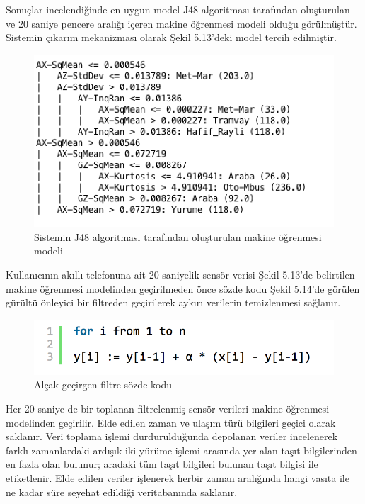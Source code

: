 Sonuçlar incelendiğinde en uygun model J48 algoritması tarafından oluşturulan ve 20 saniye pencere aralığı içeren makine öğrenmesi modeli olduğu görülmüştür. Sistemin çıkarım mekanizması olarak Şekil 5.13'deki model tercih edilmiştir.
\begin{figure}[!h]
\centering
\includegraphics[scale = 0.8]{projectChapters/images/j48model.png}
\caption{Sistemin J48 algoritması tarafından oluşturulan makine öğrenmesi modeli}
\end{figure}

Kullanıcının akıllı telefonuna ait 20 saniyelik sensör verisi Şekil 5.13'de belirtilen makine öğrenmesi modelinden geçirilmeden önce sözde kodu Şekil 5.14'de görülen gürültü önleyici bir filtreden geçirilerek aykırı verilerin temizlenmesi sağlanır. 
\begin{figure}[!h]
\centering
\includegraphics[scale = 0.8]{projectChapters/images/lowPassFilter.png}
\caption{Alçak geçirgen filtre sözde kodu}
\end{figure}

Her 20 saniye de bir toplanan filtrelenmiş sensör verileri makine öğrenmesi modelinden geçirilir. Elde edilen zaman ve ulaşım türü bilgileri geçici olarak saklanır. Veri toplama işlemi durdurulduğunda depolanan veriler incelenerek farklı zamanlardaki ardışık iki yürüme işlemi arasında yer alan  taşıt bilgilerinden en fazla olan bulunur; aradaki tüm taşıt bilgileri bulunan taşıt bilgisi ile etiketlenir. Elde edilen veriler işlenerek herbir zaman aralığında hangi vasıta ile ne kadar süre seyehat edildiği veritabanında saklanır.


